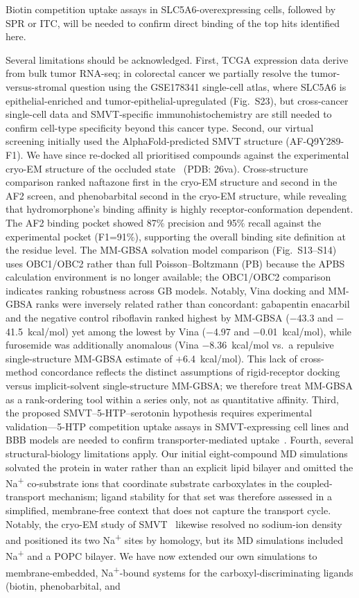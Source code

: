 \documentclass[10pt,letterpaper]{article}
\begin{document}
Biotin competition uptake assays in SLC5A6-overexpressing cells, followed by SPR or ITC, will be needed to confirm direct binding of the top hits identified here.

\noindent Several limitations should be acknowledged. First, TCGA expression data derive from bulk tumor RNA-seq; in colorectal cancer we partially resolve the tumor-versus-stromal question using the GSE178341 single-cell atlas, where SLC5A6 is epithelial-enriched and tumor-epithelial-upregulated (Fig.~S23), but cross-cancer single-cell data and SMVT-specific immunohistochemistry are still needed to confirm cell-type specificity beyond this cancer type. Second, our virtual screening initially used the AlphaFold-predicted SMVT structure (AF-Q9Y289-F1). We have since re-docked all prioritised compounds against the experimental cryo-EM structure of the occluded state~\cite{zhen2026} (PDB: 26va). Cross-structure comparison ranked naftazone first in the cryo-EM structure and second in the AF2 screen, and phenobarbital second in the cryo-EM structure, while revealing that hydromorphone's binding affinity is highly receptor-conformation dependent. The AF2 binding pocket showed 87\% precision and 95\% recall against the experimental pocket (F1=91\%), supporting the overall binding site definition at the residue level. The MM-GBSA solvation model comparison (Fig.~S13--S14) uses OBC1/OBC2 rather than full Poisson--Boltzmann (PB) because the APBS calculation environment is no longer available; the OBC1/OBC2 comparison indicates ranking robustness across GB models. Notably, Vina docking and MM-GBSA ranks were inversely related rather than concordant: gabapentin enacarbil and the negative control riboflavin ranked highest by MM-GBSA ($-$43.3 and $-$41.5~kcal/mol) yet among the lowest by Vina ($-$4.97 and $-$0.01~kcal/mol), while furosemide was additionally anomalous (Vina $-$8.36~kcal/mol vs.\ a repulsive single-structure MM-GBSA estimate of $+$6.4~kcal/mol). This lack of cross-method concordance reflects the distinct assumptions of rigid-receptor docking versus implicit-solvent single-structure MM-GBSA; we therefore treat MM-GBSA as a rank-ordering tool within a series only, not as quantitative affinity. Third, the proposed SMVT--5-HTP--serotonin hypothesis requires experimental validation---5-HTP competition uptake assays in SMVT-expressing cell lines and BBB models are needed to confirm transporter-mediated uptake~\cite{hardebo1979,nakatani2008}. Fourth, several structural-biology limitations apply. Our initial eight-compound MD simulations solvated the protein in water rather than an explicit lipid bilayer and omitted the Na\textsuperscript{+} co-substrate ions that coordinate substrate carboxylates in the coupled-transport mechanism; ligand stability for that set was therefore assessed in a simplified, membrane-free context that does not capture the transport cycle. Notably, the cryo-EM study of SMVT~\cite{zhen2026} likewise resolved no sodium-ion density and positioned its two Na\textsuperscript{+} sites by homology, but its MD simulations included Na\textsuperscript{+} and a POPC bilayer. We have now extended our own simulations to membrane-embedded, Na\textsuperscript{+}-bound systems for the carboxyl-discriminating ligands (biotin, phenobarbital, and 
\end{document}
